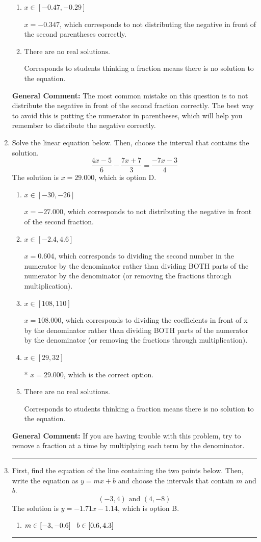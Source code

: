 \documentclass{extbook}[14pt]
\newcommand{\litem}[1]{\item #1

\rule{\textwidth}{0.4pt}}
\begin{document}
\begin{enumerate}
{\begin{enumerate}[label=\Alph*.]
$x = -2.692$, which corresponds to getting the negative of the actual solution.
\item \( x \in [-0.47, -0.29] \)

$x = -0.347$, which corresponds to not distributing the negative in front of the second parentheses correctly.
\item \( \text{There are no real solutions.} \)

Corresponds to students thinking a fraction means there is no solution to the equation.
\end{enumerate}

\textbf{General Comment:} The most common mistake on this question is to not distribute the negative in front of the second fraction correctly. The best way to avoid this is putting the numerator in parentheses, which will help you remember to distribute the negative correctly.
}
\litem{
Solve the linear equation below. Then, choose the interval that contains the solution.
\[ \frac{4x -5}{6} - \frac{7x + 7}{3} = \frac{-7x -3}{4} \]The solution is \( x = 29.000 \), which is option D.\begin{enumerate}[label=\Alph*.]
\item \( x \in [-30, -26] \)

 $x = -27.000$, which corresponds to not distributing the negative in front of the second fraction.
\item \( x \in [-2.4, 4.6] \)

 $x = 0.604$, which corresponds to dividing the second number in the numerator by the denominator rather than dividing BOTH parts of the numerator by the denominator (or removing the fractions through multiplication).
\item \( x \in [108, 110] \)

 $x = 108.000$, which corresponds to dividing the coefficients in front of x by the denominator rather than dividing BOTH parts of the numerator by the denominator (or removing the fractions through multiplication).
\item \( x \in [29, 32] \)

* $x = 29.000$, which is the correct option.
\item \( \text{There are no real solutions.} \)

Corresponds to students thinking a fraction means there is no solution to the equation.
\end{enumerate}

\textbf{General Comment:} If you are having trouble with this problem, try to remove a fraction at a time by multiplying each term by the denominator.
}
\litem{
First, find the equation of the line containing the two points below. Then, write the equation as $ y=mx+b $ and choose the intervals that contain $m$ and $b$.
\[ (-3, 4) \text{ and } (4, -8) \]The solution is \( y = -1.71x -1.14 \), which is option B.\begin{enumerate}[label=\Alph*.]
\item \( m \in [-3, -0.6] \hspace*{3mm} b \in [0.6, 4.3] \)


\end{enumerate}}
\end{enumerate}
\end{document}
